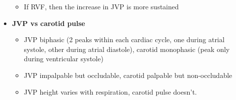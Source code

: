 \documentclass[
  12pt,
]{memoir}
\providecommand{\tightlist}{%
  \setlength{\itemsep}{0pt}\setlength{\parskip}{0pt}}
\begin{document}
\begin{itemize}
  \begin{itemize}
  \tightlist
  \item
    If RVF, then the increase in JVP is more sustained
  \end{itemize}
\item
  \textbf{JVP vs carotid pulse}

  \begin{itemize}
  \tightlist
  \item
    JVP biphasic (2 peaks within each cardiac cycle, one during atrial
    systole, other during atrial diastole), carotid monophasic (peak
    only during ventricular systole)
  \item
    JVP impalpable but occludable, carotid palpable but non-occludable
  \item
    JVP height varies with respiration, carotid pulse doesn't.
  \end{itemize}
\end{itemize}
\end{document}
